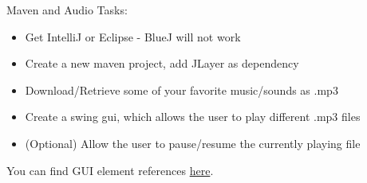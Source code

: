 \begin{frame}{Maven and Audio}
    Tasks:
    \begin{itemize}
        \item Get IntelliJ or Eclipse - BlueJ will not work
        \item Create a new maven project, add JLayer as dependency
        \item Download/Retrieve some of your favorite music/sounds as .mp3
        \item Create a swing gui, which allows the user to play different .mp3 files
        \item (Optional) Allow the user to pause/resume the currently playing file
    \end{itemize}
    You can find GUI element references \href{http://www.java-tutorial.org/swing.html}{here}.
\end{frame}



